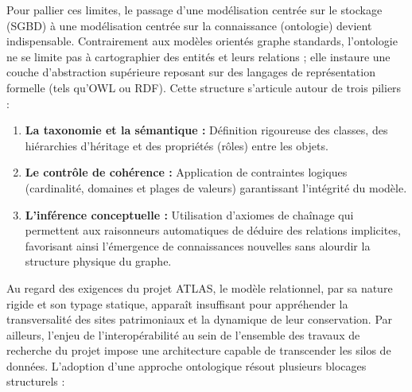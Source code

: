 \documentclass{article}
\begin{document}
Pour pallier ces limites, le passage d'une modélisation centrée sur le stockage (SGBD) à une modélisation centrée sur la connaissance (ontologie) devient indispensable. Contrairement aux modèles orientés graphe standards, l'ontologie ne se limite pas à cartographier des entités et leurs relations ; elle instaure une couche d'abstraction supérieure reposant sur des langages de représentation formelle (tels qu'OWL ou RDF). Cette structure s'articule autour de trois piliers :
\begin{enumerate}
    \item \textbf{La taxonomie et la sémantique :} Définition rigoureuse des classes, des hiérarchies d'héritage et des propriétés (rôles) entre les objets.
    \item \textbf{Le contrôle de cohérence :} Application de contraintes logiques (cardinalité, domaines et plages de valeurs) garantissant l'intégrité du modèle.
    \item \textbf{L'inférence conceptuelle :} Utilisation d'axiomes de chaînage qui permettent aux raisonneurs automatiques de déduire des relations implicites, favorisant ainsi l'émergence de connaissances nouvelles sans alourdir la structure physique du graphe.
\end{enumerate}

Au regard des exigences du projet ATLAS, le modèle relationnel, par sa nature rigide et son typage statique, apparaît insuffisant pour appréhender la transversalité des sites patrimoniaux et la dynamique de leur conservation. Par ailleurs, l'enjeu de l'interopérabilité au sein de l'ensemble des travaux de recherche du projet impose une architecture capable de transcender les silos de données. L'adoption d'une approche ontologique résout plusieurs blocages structurels :
\end{document}

